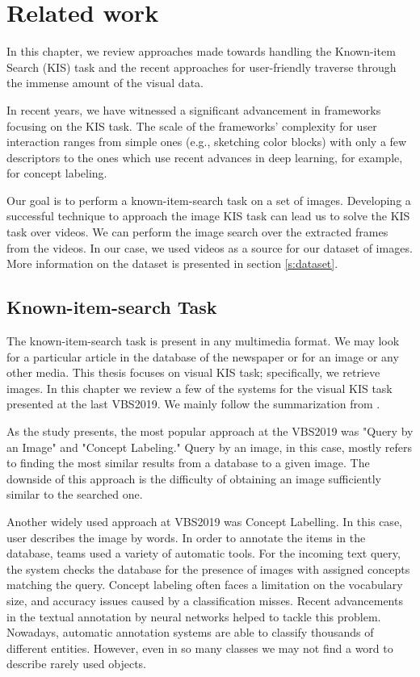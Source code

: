 \chapter{Related work}
\label{ch:related_work}


In this chapter, we review approaches made towards handling the Known-item Search (KIS) task and the recent approaches for user-friendly traverse through the immense amount of the visual data.

In recent years, we have witnessed a significant advancement in frameworks focusing on the KIS task. The scale of the frameworks' complexity for user interaction ranges from simple ones (e.g., sketching color blocks) with only a few descriptors to the ones which use recent advances in deep learning, for example, for concept labeling.

Our goal is to perform a known-item-search task on a set of images. Developing a successful technique to approach the image KIS task can lead us to solve the KIS task over videos. We can perform the image search over the extracted frames from the videos. In our case, we used videos as a source for our dataset of images. More information on the dataset is presented in section \ref{s:dataset}.

\section{Known-item-search Task}

The known-item-search task is present in any multimedia format. We may look for a particular article in the database of the newspaper or for an image or any other media. This thesis focuses on visual KIS task; specifically, we retrieve images. In this chapter we review a few of the systems for the visual KIS task presented at the last VBS2019. We mainly follow the summarization from \cite{rossetto2020interactive}.

As the study presents, the most popular approach at the VBS2019 was "Query by an Image" and "Concept Labeling." Query by an image, in this case, mostly refers to finding the most similar results from a database to a given image. The downside of this approach is the difficulty of obtaining an image sufficiently similar to the searched one.

Another widely used approach at VBS2019 was Concept Labelling. In this case, user describes the image by words. In order to annotate the items in the database, teams used a variety of automatic tools. For the incoming text query, the system checks the database for the presence of images with assigned concepts matching the query. Concept labeling often faces a limitation on the vocabulary size, and accuracy issues caused by a classification misses. Recent advancements in the textual annotation by neural networks helped to tackle this problem. Nowadays, automatic annotation systems are able to classify thousands of different entities. However, even in so many classes we may not find a word to describe rarely used objects.

